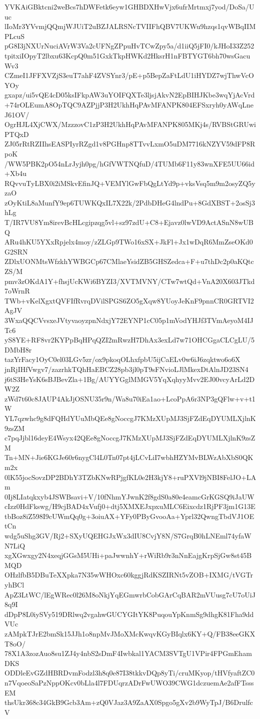 YVKAiGBktcni2weBcs7hDWFetk6eyw1GHBDXHwVjx6ufrMrtmxj7yod/DoSa/Uuc
lIoMr3YVvmjQQmjWJUiT2uBZJALRSNcTVIIFhQBV7UKWu9hzqs1qvWBqIIMPLcuS
pG8I3jNXUrNuciAVrW3Va2cUFNgZPpuHvTCwZpy5a/d1iiQ5jFI0/kJHoI33Z252
tpitxiIOpyT2lbxu63KcpQ0m51GxkTkpHWKd2HksrH1nFBTYGT6bh70wsGacuWv3
CZmeI1JFFXVZjS3euT7ahF4ZVSYnr3/pE+p5BepZaFtLdU1iHYDZ7wjThwVcOYOy
gxapz/ui5vQE4cD05ksIFkpAW3uYOIFQXTe3ljsjAkvN2EpBIHJKbe3wqYjAcVrd
+74rOLEumA8OpTQC9AZPjjP3H2UkhHqPAvMFANPK804EFSxryh0yAWqLneJ61OV/
OgrHJL4XjCWX/MzzzovC1zP3H2UkhHqPAvMFANPK805MKj4s/RVBStGRUwiPTQxD
ZJ05rRtRZIIhsEASPIyrRZgd1v8PGHnp8TTvvLxmO5uDM7716kNZYV59dFP8RpoK
/WW5PBK2pO54nLrJyjh0pg/hGfVWTNQfuD/4TUMb6F11y83wnXFE5UU66id+Xb4u
RQvvuTyLBX0i2iMSkvEfinJQ+VEMYlGwFbQgLtYd9p+vksVsq5m9m2osyZQ5yzaO
zOyKtiL8aMunfY9ep6TUWKQxIL7X22k/2PdbDHeG4lndPu+8GdXBST+2osSj3hLg
T/IR7VU8Ym8irevBcHLcgipzqg5vl+sz97zdU+C8+Ejavz0lwVD9ActASnN8wUBQ
ARu4hKU5YXxRpjelx4moy/zZLGp9TWo16xSX+JkFl+Jx1wDqR6MmZseOKd0G2SRN
ZDlxUONMtsWfzkhYWBGCp67CMlaeYsidZB5GHSZedca+F+u7thDc2p0aKQtcZS/M
pmv3zOKdA1Y+fhsjUcKWi6BYZI3/XVTMVNY/CTw7wtQd+VnA20X603JTkd7oWrnR
TWb+vKelXgxtQVFIfRvrqDVilSPGS6ZO5gXqw8YUoyJeKnF9pnnCR0GRTVI2AgJV
3WxaQQCVvsxeJVtyvaoyzpnNdxjY72EYNP1cC05p1mVodYHJf3TVmAeyoM4IJTc6
yS8YE+RF8vr2KYPpBqHPqQZI2mRwzH7DhAx3exLd7w71OHCGgaCLCgLU/5DMbH8r
tazYrFacy1OyC0el03LGv5zr/ox9pkoqOLhxfpbU5ijCaELv0w6iJ6zqktwo6o6X
jnRjIHfVwgv7/zazrhkTQhHaEBCZ28pb3jl0pT9sFNvioLJlMkexDtAlnJD23SN4
j6tS3HeYsK6sBJBevZla+1Bg/AUYYGglMMGV5YqXqhyyMvv2EJ00vcyArLd2DW2Z
zWd7t60c8JAUP4AkJjOSNU35r9n/Wa8u70iEa1ao+LcoPpA6r3NP3gQFlw+v+t1W
YL7qzwhc9g8dFQHdYUuMbQEe8gNoccgJ7KMzXUpMJ3SjFZdEqDYUMLXjlnK9zsZM
c7pqJjbl16deyE4Wsyx42QEe8gNoccgJ7KMzXUpMJ3SjFZdEqDYUMLXjlnK9zsZM
Tn+MN+Jie6KGJe60r6nygCl4L0Tn07pt4jLCvLiI7wbhHZYMvBLWzAbXbS0QKm2x
0lK55jocSovzDP2BDhY3TZbKNwRPjgfKL0e2H3kjY8+ruPXVl9jNBI8FelJO+LAm
0Ij8LIatqkxyb4JSWBsavi+V/10fNhmYJwnK2f8gdS0a80e4eamcGrKGSQ9iJaUW
cIzz0HdFkswg/H9cjBAD4xVufj0+dtj5XMXEJxpxuMLC6Eixcdz1RjPF3jm1G13E
tbBoz8iZ598I9cUWmQq0g+3oiuAX+YFy0PByGvooAa+Yprl32QwngTbdVJ1OEtCn
wdg5uShg3GV/Rj2+SXyUQEHGJxWx3dIU8CvjY8N/S7GrqB0hLNEml74yfaWN7LiQ
xgXGwxgy2N4xeqjGGsM5UHi+paJwwnhY+rWiRb9r3nNnEajgKrpSjGw8st45BMQD
OHzlfbB5DBuTeXXpka7N35wWHOxc60kggjRdKSZIRNt5vZOB+IXMG/tVGTryhBCl
ApZ3LtWC/lEgWRec0l26M8oNkjYqEGmwrbCobGArCqBAR2mVUusg7cU7oUiJ8q9I
dDpP8L0iySVy519DRlwq2vgahwGUCYGItYK8PuqouYpKnmSg9dhgK81Fha9ddVUc
zAMpkTJrE2bmSk15JJh1o8npMvJMoXMcKwqvKGyBIqlx6KY+Q/FB38eeGKXT8oO/
78X1A3zozAuo8su1ZJ4y4nbS2sDmF4Iwbkal1YACM3SVTgU1VPir4FPGmEhamDKS
ODDleEvGZdHBRDvmFodzl3h8q0e87I38tkkvDQp8yTi/cruMKyop/tHVfyaftZC0
n7VqoeoSaPzNppOKcv0bLla4l7FDUqrzADrFwUWO39CWG1dczuemAe2afFTsssEM
thsUkr368c34GkB9Gcb3Am+zQ0VJaz3A9ZaAX0Spgo5gXv2b9WyTpJ/B6DrulfcV
